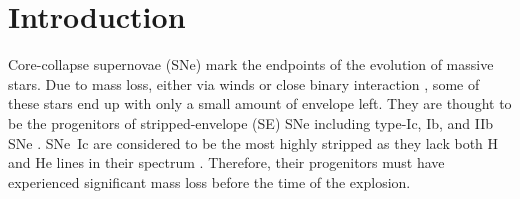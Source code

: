 \documentclass[twocolumn]{aastex61}
\begin{document}



\section{Introduction} 

Core-collapse supernovae (SNe) mark the endpoints of {the evolution of massive stars}.
Due to mass loss, either via winds \citep{vink01} or close binary interaction \citep{podsiadlowski92}, some of these stars end up with only a small amount of envelope left. They are thought to be the progenitors of stripped-envelope (SE) SNe {including} type-Ic, Ib, and IIb SNe {\citep[][]{galyam16}}. SNe~Ic are considered to be the most highly stripped as they lack both H and He lines in their spectrum \citep[{e.g.}][]{prentice17}. 
{Therefore, their} progenitors must have experienced significant mass loss before the time of the explosion. 
\end{document}
